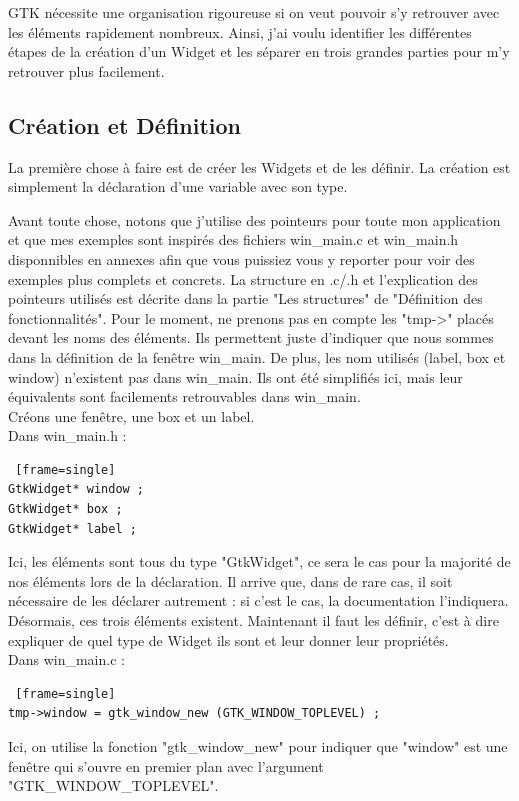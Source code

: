 \documentclass[11pt,french,a4paper]{report}
\begin{document}
GTK nécessite une organisation rigoureuse si on veut pouvoir s'y retrouver avec les éléments rapidement nombreux.
Ainsi, j'ai voulu identifier les différentes étapes de la création d'un Widget et les séparer en 
trois grandes parties pour m'y retrouver plus facilement. \\

        \subsection{Création et Définition}
La première chose à faire est de créer les Widgets et de les définir. La création est simplement la déclaration d'une variable 
avec son type. 

Avant toute chose, notons que j'utilise des pointeurs pour toute mon application et que mes exemples 
sont inspirés des fichiers win\_main.c et win\_main.h disponnibles en annexes 
afin que vous puissiez vous y reporter pour voir des exemples plus complets et concrets. 
La structure en .c/.h et l'explication des pointeurs utilisés est décrite dans la partie "Les structures" de 
"Définition des fonctionnalités". Pour le moment, ne prenons pas en compte les "tmp->" placés devant les noms des éléments.
Ils permettent juste d'indiquer que nous sommes dans la définition de la fenêtre win\_main.
De plus, les nom utilisés (label, box et window) n'existent pas dans win\_main. Ils ont été simplifiés ici, 
mais leur équivalents sont facilements retrouvables dans win\_main.\\

Créons une fenêtre, une box et un label.\\
\small Dans win\_main.h : 
\begin{lstlisting} [frame=single]
GtkWidget* window ; 
GtkWidget* box ;   
GtkWidget* label ;  
\end{lstlisting}
Ici, les éléments sont tous du type "GtkWidget", ce sera le cas pour la majorité de nos éléments lors de la 
déclaration.
Il arrive que, dans de rare cas, il soit nécessaire de les déclarer autrement : si c'est le cas, la documentation l'indiquera. \\ 


Désormais, ces trois éléments existent. Maintenant il faut les définir, c'est à dire expliquer de quel type de Widget ils sont 
et leur donner leur propriétés. \\
\small Dans win\_main.c :
\begin{lstlisting} [frame=single]
tmp->window = gtk_window_new (GTK_WINDOW_TOPLEVEL) ;
\end{lstlisting}
Ici, on utilise la fonction "gtk\_window\_new" pour indiquer que "window" est une fenêtre qui s'ouvre en premier plan 
avec l'argument "GTK\_WINDOW\_TOPLEVEL". \\
\end{document}
